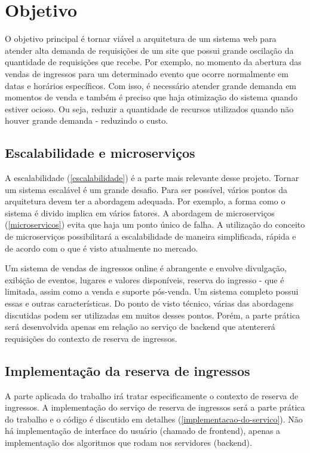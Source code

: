 \chapter{Objetivo}

O objetivo principal é tornar viável a arquitetura de um sistema web para atender
alta demanda de requisições de um site que possui grande oscilação da quantidade de
requisições que recebe.
Por exemplo, no momento da abertura das vendas de ingressos para um determinado evento
que ocorre normalmente em datas e horários específicos.
Com isso, é necessário atender grande demanda em momentos de venda e também
é preciso que haja otimização do sistema quando estiver ocioso.
Ou seja, reduzir a quantidade de recursos utilizados quando não houver
grande demanda - reduzindo o custo.

\section{Escalabilidade e microserviços}
A escalabilidade (\autoref{escalabilidade}) é a parte mais relevante desse projeto.
Tornar um sistema escalável é um grande desafio.
Para ser possível, vários pontos da arquitetura devem ter a
abordagem adequada. Por exemplo, a forma como o sistema é divido implica em vários
fatores.
A abordagem de microserviços (\autoref{microservicos}) evita que haja um ponto único de falha. A
utilização do conceito de microserviços possibilitará a escalabilidade de maneira
simplificada, rápida e de acordo com o que é visto atualmente no mercado.

Um sistema de vendas de ingressos online é abrangente e envolve divulgação,
exibição de eventos, lugares e valores disponíveis, reserva do ingresso -
que é limitada, assim como a venda e suporte pós-venda. Um sistema completo possui essas
e outras características. Do ponto de visto técnico, várias das abordagens discutidas
podem ser utilizadas em muitos desses pontos. Porém, a parte prática será desenvolvida
apenas em relação ao serviço de backend que atentererá requisições do contexto de reserva
de ingressos.

\section{Implementação da reserva de ingressos}

A parte aplicada do trabalho irá tratar especificamente o contexto de reserva de ingressos.
A implementação do serviço de reserva de ingressos será a parte prática do trabalho
e o código é discutido em detalhes (\autoref{implementacao-do-servico}). Não há implementação
de interface do usuário (chamado de frontend), apenas a implementação dos algoritmos
que rodam nos servidores (backend).

